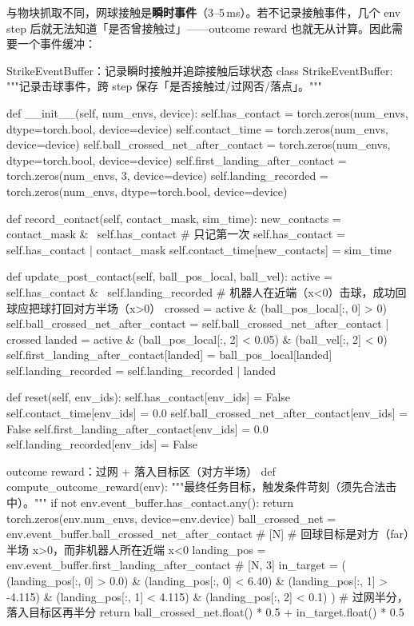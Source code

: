 与物块抓取不同，网球接触是\textbf{瞬时事件}（3--5\,ms）。若不记录接触事件，几个 env step 后就无法知道「是否曾接触过」——outcome reward 也就无从计算。因此需要一个事件缓冲：

\begin{codebox}[Python]{StrikeEventBuffer：记录瞬时接触并追踪接触后球状态}
class StrikeEventBuffer:
    """记录击球事件，跨 step 保存「是否接触过/过网否/落点」。"""

    def __init__(self, num_envs, device):
        self.has_contact = torch.zeros(num_envs, dtype=torch.bool, device=device)
        self.contact_time = torch.zeros(num_envs, device=device)
        self.ball_crossed_net_after_contact = torch.zeros(num_envs, dtype=torch.bool, device=device)
        self.first_landing_after_contact = torch.zeros(num_envs, 3, device=device)
        self.landing_recorded = torch.zeros(num_envs, dtype=torch.bool, device=device)

    def record_contact(self, contact_mask, sim_time):
        new_contacts = contact_mask & ~self.has_contact   # 只记第一次
        self.has_contact = self.has_contact | contact_mask
        self.contact_time[new_contacts] = sim_time

    def update_post_contact(self, ball_pos_local, ball_vel):
        active = self.has_contact & ~self.landing_recorded
        # 机器人在近端（x<0）击球，成功回球应把球打回对方半场（x>0）
        crossed = active & (ball_pos_local[:, 0] > 0)
        self.ball_crossed_net_after_contact = self.ball_crossed_net_after_contact | crossed
        landed = active & (ball_pos_local[:, 2] < 0.05) & (ball_vel[:, 2] < 0)
        self.first_landing_after_contact[landed] = ball_pos_local[landed]
        self.landing_recorded = self.landing_recorded | landed

    def reset(self, env_ids):
        self.has_contact[env_ids] = False
        self.contact_time[env_ids] = 0.0
        self.ball_crossed_net_after_contact[env_ids] = False
        self.first_landing_after_contact[env_ids] = 0.0
        self.landing_recorded[env_ids] = False
\end{codebox}

\begin{codebox}[Python]{outcome reward：过网 + 落入目标区（对方半场）}
def compute_outcome_reward(env):
    """最终任务目标，触发条件苛刻（须先合法击中）。"""
    if not env.event_buffer.has_contact.any():
        return torch.zeros(env.num_envs, device=env.device)
    ball_crossed_net = env.event_buffer.ball_crossed_net_after_contact   # [N]
    # 回球目标是对方（far）半场 x>0，而非机器人所在近端 x<0
    landing_pos = env.event_buffer.first_landing_after_contact           # [N, 3]
    in_target = (
        (landing_pos[:, 0] > 0.0) & (landing_pos[:, 0] < 6.40) &
        (landing_pos[:, 1] > -4.115) & (landing_pos[:, 1] < 4.115) &
        (landing_pos[:, 2] < 0.1)
    )
    # 过网半分，落入目标区再半分
    return ball_crossed_net.float() * 0.5 + in_target.float() * 0.5
\end{codebox}

